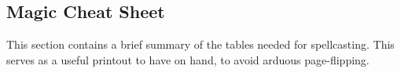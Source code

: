 \onecolumn
\begin{landscape}

\section{Magic Cheat Sheet}

This section contains a brief summary of the tables needed for spellcasting. This serves as a useful printout to have on hand, to avoid arduous page-flipping. 

\begin{multicols}{2}
\blindtext[5]
\end{multicols}
\end{landscape}
